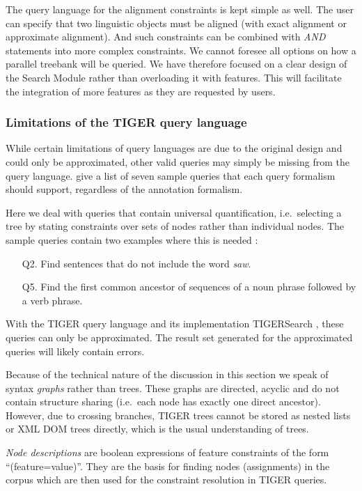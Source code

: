 \documentclass[output=paper]{LSP/langsci}
\begin{document}
The query language for the alignment constraints is kept simple as well. The user can specify that two linguistic objects must be aligned (with exact alignment or approximate alignment). And such constraints can be combined with \textit{AND} statements into more complex constraints. We cannot foresee all options on how a parallel treebank will be queried. We have therefore focused on a clear design of the Search Module rather than overloading it with features. This will facilitate the integration of more features as they are requested by users. 

\subsubsection{Limitations of the TIGER query language}\label{sec:volk:3.2.1}

While certain limitations of query languages are due to the original design and could only be approximated, other valid queries may simply be missing from the query language. \citet{Lai2004} give a list of seven sample queries that each query formalism should support, regardless of the annotation formalism. 

Here we deal with queries that contain universal quantification, i.e.~selecting a tree by stating constraints over sets of nodes rather than individual nodes. The sample queries contain two examples where this is needed \citep{Lai2004}: 

\begin{itemize}
 \item[Q2.] Find sentences that do not include the word \textit{saw}.  
 \item[Q5.] Find the first common ancestor of sequences of a noun phrase followed by a verb phrase.
\end{itemize}

With the TIGER query language and its implementation TIGERSearch \citep{Lezius2002a}, these queries can only be approximated. The result set generated for the approximated queries will likely contain errors. 

Because of the technical nature of the discussion in this section we speak of syntax \textit{graphs} rather than trees. These graphs are directed, acyclic and do not contain structure sharing (i.e.~each node has exactly one direct ancestor). However, due to crossing branches, TIGER trees cannot be stored as nested lists or XML DOM trees directly, which is the usual understanding of trees. 

\textit{Node descriptions} are boolean expressions of feature constraints of the form ``(feature=value)''. They are the basis for finding nodes (assignments) in the corpus which are then used for the constraint resolution in TIGER queries. 
\end{document}
